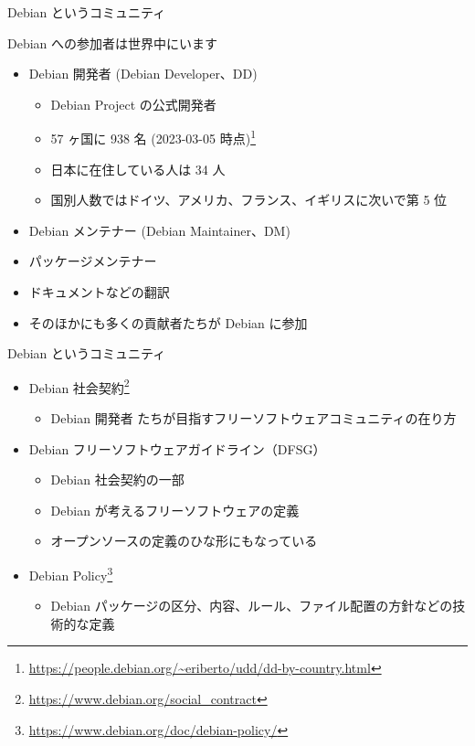 \begin{frame}{Debian というコミュニティ}

Debian への参加者は世界中にいます

\begin{itemize}
\item Debian 開発者 (Debian Developer、DD)
  \begin{itemize}
  \item Debian Project の公式開発者
  \item 57 ヶ国に 938 名 (2023-03-05 時点)\footnote{\url{https://people.debian.org/~eriberto/udd/dd-by-country.html}}
  \item 日本に在住している人は 34 人
  \item 国別人数ではドイツ、アメリカ、フランス、イギリスに次いで第 5 位
  \end{itemize}
\item Debian メンテナー (Debian Maintainer、DM)
\item パッケージメンテナー
\item ドキュメントなどの翻訳
\item そのほかにも多くの貢献者たちが Debian に参加
\end{itemize}
  
\end{frame}


\begin{frame}{Debian というコミュニティ}

\begin{itemize}
\item Debian 社会契約\footnote{\url{https://www.debian.org/social_contract}}
  \begin{itemize}
  \item Debian 開発者 たちが目指すフリーソフトウェアコミュニティの在り方
  \end{itemize}
\item Debian フリーソフトウェアガイドライン（DFSG）
  \begin{itemize}
  \item Debian 社会契約の一部
  \item Debian が考えるフリーソフトウェアの定義
  \item オープンソースの定義のひな形にもなっている
  \end{itemize}
\item Debian Policy\footnote{\url{https://www.debian.org/doc/debian-policy/}}
  \begin{itemize}
  \item Debian パッケージの区分、内容、ルール、ファイル配置の方針などの技術的な定義
  \end{itemize}
\end{itemize}

\end{frame}


